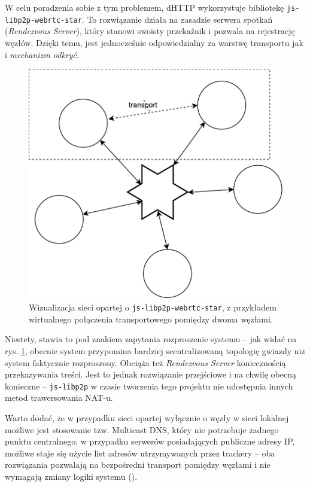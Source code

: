 W celu poradzenia sobie z tym problemem, dHTTP wykorzystuje bibliotekę \texttt{js-libp2p-webrtc-star}. To rozwiązanie działa na zasadzie serwera spotkań ({\em Rendezvous Server}), który stanowi swoisty przekaźnik i pozwala na rejestrację węzłów. Dzięki temu, jest jednocześnie odpowiedzialny za warstwę transportu jak i {\em mechanizm odkryć}.

\begin{figure}[h]
        \centering
        \includegraphics[scale=0.5]{webrtc-star.pdf}
    
        \caption{Wizualizacja sieci opartej o \texttt{js-libp2p-webrtc-star}, z przykładem wirtualnego połączenia transportowego pomiędzy dwoma węzłami.}
        \label{fig:webrtc-star}
\end{figure}

Niestety, stawia to pod znakiem zapytania rozproszenie systemu -- jak widać na rys. \ref{fig:webrtc-star}, obecnie system przypomina bardziej scentralizowaną topologię gwiazdy niż system faktycznie rozproszony. Obciąża też {\em Rendezvous Server} koniecznością przekazywania treści. Jest to jednak rozwiązanie przejściowe i na chwilę obecną konieczne -- \texttt{js-libp2p} w czasie tworzenia tego projektu nie udostępnia innych metod trawersowania NAT-u.

Warto dodać, że w przypadku sieci opartej wyłącznie o węzły w sieci lokalnej możliwe jest stosowanie tzw. Multicast DNS, który nie potrzebuje żadnego punktu centralnego; w przypadku serwerów posiadających publiczne adresy IP, możliwe staje się użycie list adresów utrzymywanych przez trackery -- oba rozwiązania pozwalają na bezpośredni transport pomiędzy węzłami i nie wymagają zmiany logiki systemu (\cite{discoverylibp2p}).

